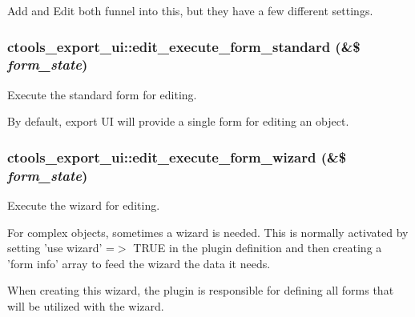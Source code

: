 Add and Edit both funnel into this, but they have a few different settings. \hypertarget{classctools__export__ui_af84dd7b0d7b101b9e675b77015922e90}{
\subsubsection[{edit\_\-execute\_\-form\_\-standard}]{\setlength{\rightskip}{0pt plus 5cm}ctools\_\-export\_\-ui::edit\_\-execute\_\-form\_\-standard (\&\$ {\em form\_\-state})}}
\label{classctools__export__ui_af84dd7b0d7b101b9e675b77015922e90}
Execute the standard form for editing.

By default, export UI will provide a single form for editing an object. \hypertarget{classctools__export__ui_a1148521266892c63324c1a72ea70f71d}{
\subsubsection[{edit\_\-execute\_\-form\_\-wizard}]{\setlength{\rightskip}{0pt plus 5cm}ctools\_\-export\_\-ui::edit\_\-execute\_\-form\_\-wizard (\&\$ {\em form\_\-state})}}
\label{classctools__export__ui_a1148521266892c63324c1a72ea70f71d}
Execute the wizard for editing.

For complex objects, sometimes a wizard is needed. This is normally activated by setting 'use wizard' =$>$ TRUE in the plugin definition and then creating a 'form info' array to feed the wizard the data it needs.

When creating this wizard, the plugin is responsible for defining all forms that will be utilized with the wizard.

